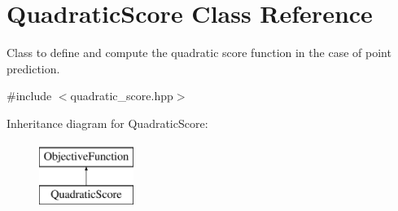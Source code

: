 \hypertarget{classQuadraticScore}{\section{Quadratic\-Score Class Reference}
\label{classQuadraticScore}
}


Class to define and compute the quadratic score function in the case of point prediction.  




{\ttfamily \#include $<$quadratic\-\_\-score.\-hpp$>$}

Inheritance diagram for Quadratic\-Score\-:\begin{figure}[H]
\begin{center}
\leavevmode
\includegraphics[height=2.000000cm]{classQuadraticScore}
\end{center}
\end{figure}
